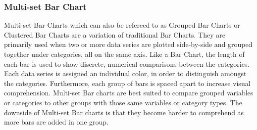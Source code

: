 \subsubsection{Multi-set Bar Chart}
Multi-set Bar Charts which can also be refereed to as Grouped Bar Charts or Clustered 
Bar Charts are a variation of traditional Bar Charts. They are primarily used when 
two or more data series are plotted side-by-side and grouped together under categories, 
all on the same axis. Like a Bar Chart, the length of each bar is used to show 
discrete, numerical comparisons between the categories. Each data series is assigned 
an individual color, in order to distinguish amongst the categories. Furthermore, 
each group of bars is spaced apart to increase visual comprehension. Multi-set 
Bar charts are best suited to compare grouped variables or categories to other 
groups with those same variables or category types. The downside of Multi-set Bar 
charts is that they become harder to comprehend as more bars are added in one 
group.

